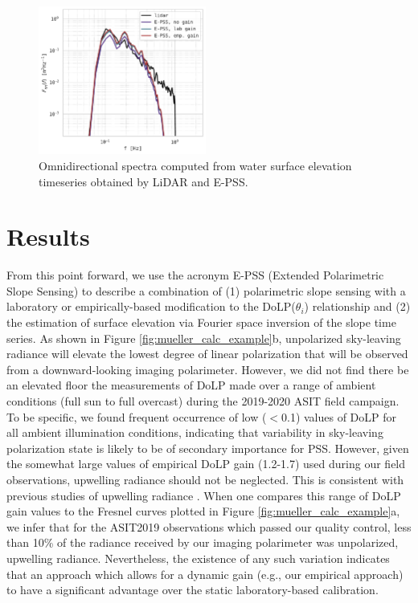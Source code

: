 \documentclass[letterpaper,journal]{IEEEtran}
\begin{document}
\begin{figure}[!ht]
    \centering
    \includegraphics[width=0.49\textwidth]{_figures/elevation_omnispect.pdf}
    \vspace{-25pt}
\caption{Omnidirectional spectra computed from water surface elevation timeseries obtained by LiDAR and E-PSS.}
\label{fig:elevation_omnispect}
\end{figure}

\newpage

\section{Results}
\label{sec:results}

From this point forward, we use the acronym E-PSS (Extended Polarimetric Slope Sensing) to describe a combination of (1) polarimetric slope sensing with a laboratory or empirically-based modification to the DoLP($\theta_i$) relationship and (2) the estimation of surface elevation via Fourier space inversion of the slope time series. As shown in Figure \ref{fig:mueller_calc_example}b, unpolarized sky-leaving radiance will elevate the lowest degree of linear polarization that will be observed from a downward-looking imaging polarimeter. However, we did not find there be an elevated floor the measurements of DoLP made over a range of ambient conditions (full sun to full overcast) during the 2019-2020 ASIT field campaign. To be specific, we found frequent occurrence of low ($<$0.1) values of DoLP for all ambient illumination conditions, indicating that variability in sky-leaving polarization state is likely to be of secondary importance for PSS. However, given the somewhat large values of empirical DoLP gain (1.2-1.7) used during our field observations, upwelling radiance should not be neglected. This is consistent with previous studies of upwelling radiance \cite{You2011,ibrahim_relationship_2012}. When one compares this range of DoLP gain values to the Fresnel curves plotted in Figure \ref{fig:mueller_calc_example}a, we infer that for the ASIT2019 observations which passed our quality control, less than 10\% of the radiance received by our imaging polarimeter was unpolarized, upwelling radiance. Nevertheless, the existence of any such variation indicates that an approach which allows for a dynamic gain (e.g., our empirical approach) to have a significant advantage over the static laboratory-based calibration.
\end{document}
